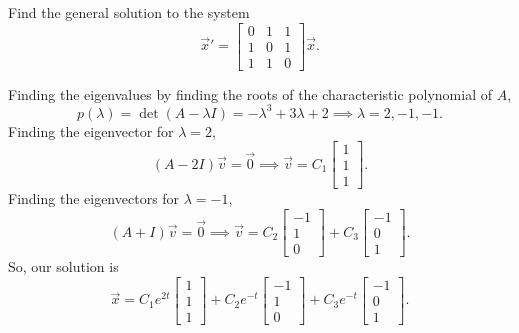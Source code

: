 \begin{example}
	Find the general solution to the system
	\begin{equation*}
		\vec{x}' = \begin{bmatrix}
			0 & 1 & 1 \\
			1 & 0 & 1 \\
			1 & 1 & 0
		\end{bmatrix} \vec{x}.
	\end{equation*}
\end{example}
\noindent
Finding the eigenvalues by finding the roots of the characteristic polynomial of $A$,
\begin{equation*}
	p(\lambda) = \det{(A - \lambda I)} = -\lambda^3 + 3\lambda + 2 \implies \lambda = 2, -1, -1.
\end{equation*}
Finding the eigenvector for $\lambda = 2$,
\begin{equation*}
	(A - 2I)\vec{v} = \vec{0} \implies \vec{v} = C_1\begin{bmatrix}
		1 \\
		1 \\
		1
	\end{bmatrix}.
\end{equation*}
Finding the eigenvectors for $\lambda = -1$,
\begin{equation*}
	(A + I)\vec{v} = \vec{0} \implies \vec{v} = C_2\begin{bmatrix}
		-1 \\
		1 \\
		0
	\end{bmatrix} + C_3\begin{bmatrix}
		-1 \\
		0 \\
		1
	\end{bmatrix}.
\end{equation*}
So, our solution is
\begin{equation*}
	\vec{x} = C_1e^{2t}\begin{bmatrix}
		1 \\
		1 \\
		1
	\end{bmatrix} + C_2e^{-t}\begin{bmatrix}
		-1 \\
		1 \\
		0
	\end{bmatrix} + C_3e^{-t}\begin{bmatrix}
		-1 \\
		0 \\
		1
	\end{bmatrix}.
\end{equation*}